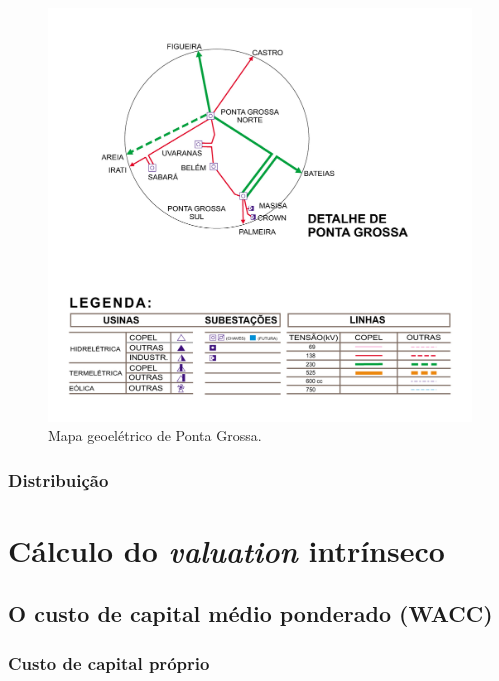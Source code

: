 \documentclass[aprovado,numbers]{coppe}
\begin{document}
  \begin{figure}[H]
  \includegraphics[width=1\linewidth]{img/mapa_geoeletrico_ponta_grossa} \caption{Mapa geoelétrico de Ponta Grossa.}\label{fig:unnamed-chunk-9}
  \end{figure}
  \hypertarget{distribuiuxe7uxe3o}{%
  \subsubsection{Distribuição}\label{distribuiuxe7uxe3o}}

  \hypertarget{cuxe1lculo-do-valuation-intruxednseco}{%
  \section{\texorpdfstring{Cálculo do \emph{valuation} intrínseco}{Cálculo do valuation intrínseco}}\label{cuxe1lculo-do-valuation-intruxednseco}}

  \hypertarget{o-custo-de-capital-muxe9dio-ponderado-wacc}{%
  \subsection{O custo de capital médio ponderado (WACC)}\label{o-custo-de-capital-muxe9dio-ponderado-wacc}}

  \hypertarget{custo-de-capital-pruxf3prio}{%
  \subsubsection{Custo de capital próprio}\label{custo-de-capital-pruxf3prio}}
\end{document}
